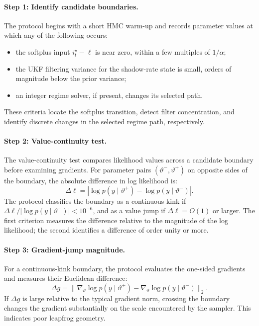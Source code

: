 \documentclass[11pt]{article}
\begin{document}
\paragraph{Step 1: Identify candidate boundaries.}
The protocol begins with a short HMC warm-up and records parameter values at which any of the following occurs:
\begin{itemize}
\item the softplus input $i_t^\star - \ell$ is near zero, within a few multiples of $1/\alpha$;
\item the UKF filtering variance for the shadow-rate state is small, orders of magnitude below the prior variance;
\item an integer regime solver, if present, changes its selected path.
\end{itemize}
These criteria locate the softplus transition, detect filter concentration, and identify discrete changes in the selected regime path, respectively.

\paragraph{Step 2: Value-continuity test.}
The value-continuity test compares likelihood values across a candidate boundary before examining gradients. For parameter pairs $(\vartheta^-, \vartheta^+)$ on opposite sides of the boundary, the absolute difference in log likelihood is:
\[
 \Delta\ell = |\log p(y\mid\vartheta^+) - \log p(y\mid\vartheta^-)|.
\]
The protocol classifies the boundary as a continuous kink if $\Delta\ell / |\log p(y\mid\vartheta^-)| < 10^{-6}$, and as a value jump if $\Delta\ell = O(1)$ or larger. The first criterion measures the difference relative to the magnitude of the log likelihood; the second identifies a difference of order unity or more.

\paragraph{Step 3: Gradient-jump magnitude.}
For a continuous-kink boundary, the protocol evaluates the one-sided gradients and measures their Euclidean difference:
\[
 \Delta g = \|\nabla_\vartheta\log p(y\mid\vartheta^+)
             - \nabla_\vartheta\log p(y\mid\vartheta^-)\|_2.
\]
If $\Delta g$ is large relative to the typical gradient norm, crossing the boundary changes the gradient substantially on the scale encountered by the sampler. This indicates poor leapfrog geometry.
\end{document}
